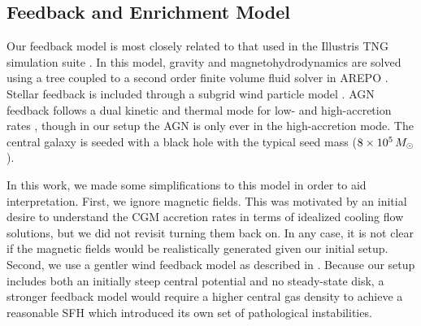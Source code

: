 \subsection{Feedback and Enrichment Model}\label{ssec:gfm}
Our feedback model is most closely related to that used in the Illustris TNG simulation suite \citep{2013MNRAS.436.3031V,2017MNRAS.465.3291W,2018MNRAS.473.4077P}. In this model, gravity and magnetohydrodynamics are solved using a \citet{1986Natur.324..446B} tree coupled to a second order finite volume fluid solver in AREPO \citep{2010MNRAS.401..791S,2016MNRAS.455.1134P}. Stellar feedback is included through a subgrid wind particle model \citep{2003MNRAS.339..289S}. AGN feedback follows a dual kinetic and thermal mode for low- and high-accretion rates \citep{2017MNRAS.465.3291W}, though in our setup the AGN is only ever in the high-accretion mode. The central galaxy is seeded with a black hole with the typical seed mass ($8\times10^5\,M_{\odot}$). 

In this work, we made some simplifications to this model in order to aid interpretation. First, we ignore magnetic fields. This was motivated by an initial desire to understand the CGM accretion rates in terms of idealized cooling flow solutions, but we did not revisit turning them back on. In any case, it is not clear if the magnetic fields would be realistically generated given our initial setup. Second, we use a gentler wind feedback model as described in \citet{2019MNRAS.489.4233M}. Because our setup includes both an initially steep central potential and no steady-state disk, a stronger feedback model would require a higher central gas density to achieve a reasonable SFH which introduced its own set of pathological instabilities.

